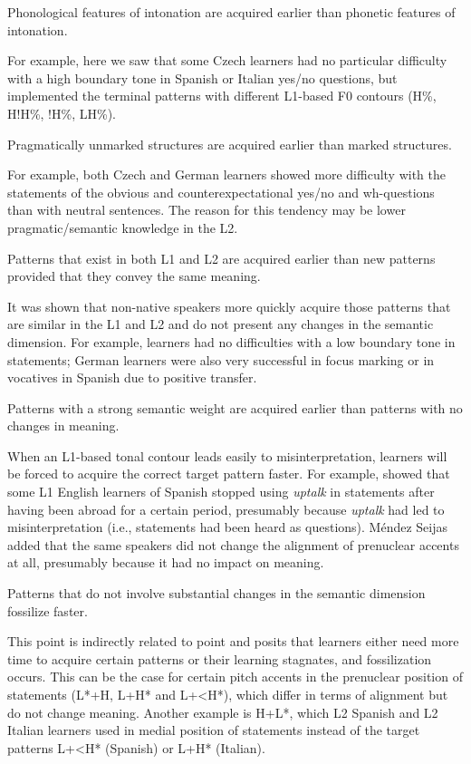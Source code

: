 \ea%
    \label{ex:1}
    Phonological features of intonation are acquired earlier than phonetic features of intonation.
    \z

For example, here we saw that some Czech learners had no particular difficulty with a high boundary tone in Spanish or Italian yes/no questions, but implemented the terminal patterns with different L1-based F0 contours (H\%, H!H\%, !H\%, LH\%).

\ea%
    \label{ex:2}
    Pragmatically unmarked structures are acquired earlier than marked structures.
    \z

For example, both Czech and German learners showed more difficulty with the statements of the obvious and counterexpectational yes/no and wh-questions than with neutral sentences. The reason for this tendency may be lower pragmatic/semantic knowledge in the L2.

\ea%
    \label{ex:3}
    Patterns that exist in both L1 and L2 are acquired earlier than new patterns provided that they convey the same meaning.
    \z

It was shown that non-native speakers more quickly acquire those patterns that are similar in the L1 and L2 and do not present any changes in the semantic dimension. For example, learners had no difficulties with a low boundary tone in statements; German learners were also very successful in focus marking or in vocatives in Spanish due to positive transfer.

\ea%
    \label{ex:4}
  Patterns with a strong semantic weight are acquired earlier than patterns with no changes in meaning.
  \z

When an L1-based tonal contour leads easily to misinterpretation, learners will be forced to acquire the correct target pattern faster. For example,  \citet{MéndezSeijas2018} showed that some L1 English learners of Spanish stopped using \textit{uptalk} in statements after having been abroad for a certain period, presumably because \textit{uptalk} had led to misinterpretation (i.e., statements had been heard as questions). Méndez Seijas added that the same speakers did not change the alignment of prenuclear accents at all, presumably because it had no impact on meaning.

\ea%
    \label{ex:5}
    Patterns that do not involve substantial changes in the semantic dimension fossilize faster.
    \z

This point is indirectly related to point  and posits that learners either need more time to acquire certain patterns or their learning stagnates, and fossilization occurs. This can be the case for certain pitch accents in the prenuclear position of statements (L*+H, L+H* and L+<H*), which differ in terms of alignment but do not change meaning. Another example is H+L*, which L2 Spanish and L2 Italian learners used in medial position of statements instead of the target patterns L+<H* (Spanish) or L+H* (Italian).

